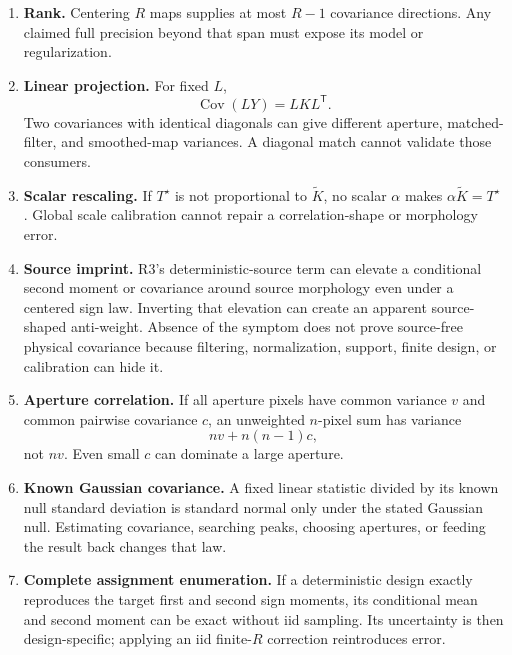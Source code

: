 \documentclass[11pt]{article}
\newcommand{\Cov}{\operatorname{Cov}}
\begin{document}
\begin{enumerate}
\item \textbf{Rank.}  Centering $R$ maps supplies at most $R-1$ covariance
directions.  Any claimed full precision beyond that span must expose its
model or regularization.

\item \textbf{Linear projection.}  For fixed $L$,
\begin{equation}
  \Cov(LY)=LKL^{\mathsf T}.
  \label{eq:linear-projection-covariance}
\end{equation}
Two covariances with identical diagonals can give different aperture,
matched-filter, and smoothed-map variances.  A diagonal match cannot validate
those consumers.

\item \textbf{Scalar rescaling.}  If $T^\star$ is not proportional to
$\widetilde K$, no scalar $\alpha$ makes
$\alpha\widetilde K=T^\star$.  Global scale calibration cannot repair a
correlation-shape or morphology error.

\item \textbf{Source imprint.}  R3's deterministic-source term can elevate a
conditional second moment or covariance around source morphology even under a
centered sign law.  Inverting that elevation can create an apparent source-
shaped anti-weight.  Absence of the symptom does not prove source-free
physical covariance because filtering, normalization, support, finite design,
or calibration can hide it.

\item \textbf{Aperture correlation.}  If all aperture pixels have common
variance $v$ and common pairwise covariance $c$, an unweighted $n$-pixel sum
has variance
\begin{equation}
  nv+n(n-1)c,
  \label{eq:equicorrelated-aperture}
\end{equation}
not $nv$.  Even small $c$ can dominate a large aperture.

\item \textbf{Known Gaussian covariance.}  A fixed linear statistic divided
by its known null standard deviation is standard normal only under the stated
Gaussian null.  Estimating covariance, searching peaks, choosing apertures,
or feeding the result back changes that law.

\item \textbf{Complete assignment enumeration.}  If a deterministic design
exactly reproduces the target first and second sign moments, its conditional
mean and second moment can be exact without iid sampling.  Its uncertainty is
then design-specific; applying an iid finite-$R$ correction reintroduces error.
\end{enumerate}
\end{document}
